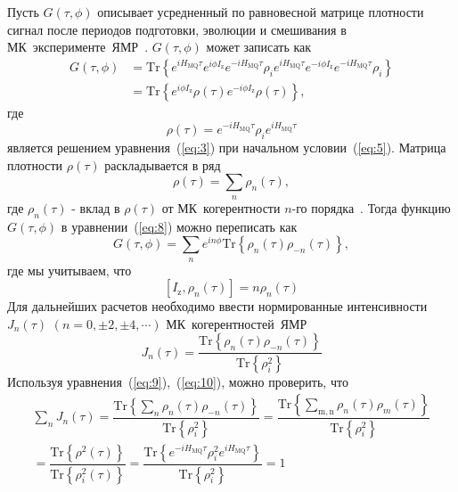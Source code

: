 \documentclass[utf8]{jetp}
\begin{document}
Пусть $G(\tau,\phi)$ описывает усредненный по равновесной матрице плотности сигнал после периодов подготовки, эволюции и смешивания в МК~эксперименте~ЯМР~\cite{Baum_1985}.
$G(\tau,\phi)$ может записать как~\cite{Doronin_2019}
%
\begin{equation}
  \begin{split}
    \label{eq:8}
    G(\tau,\phi)
    & = \mathrm{Tr}\left\{
      e^{i H_\mathrm{MQ} \tau} e^{i\phi I_\mathrm{z}} e^{-i H_\mathrm{MQ}\tau}
      \rho_i
      e^{i H_\mathrm{MQ} \tau} e^{-i \phi I_\mathrm{z}} e^{-i H_\mathrm{MQ} \tau}
      \rho_i
    \right\} \\
    & = \mathrm{Tr} \left\{
    e^{i \phi I_\mathrm{z}}
    \rho(\tau)
    e^{-i \phi I_\mathrm{z}}
    \rho(\tau)
    \right\},
  \end{split}
\end{equation}
%
где
%
\begin{equation}
  \label{eq:9}
  \rho(\tau)
  = e^{-i H_\mathrm{MQ} \tau }
  \rho_i
  e^{i H_\mathrm{MQ} \tau}
\end{equation}
%
является решением уравнения~(\ref{eq:3}) при начальном условии~(\ref{eq:5}).
Матрица плотности $\rho(\tau)$ раскладывается в ряд
%
\begin{equation}
  \label{eq:10}
  \rho(\tau) = \sum\limits_n \rho_n(\tau),
\end{equation}
%
где $\rho_{n}(\tau)$ - вклад в $\rho(\tau)$ от МК~когерентности $n$-го порядка~\cite{Fel_dman_1996}.
Тогда  функцию $G(\tau,\phi)$ в уравнении~(\ref{eq:8}) можно переписать как
%
\begin{equation}
  \label{eq:11}
  G(\tau,\phi)
  = \sum\limits_n e^{i n \phi} \mathrm{Tr} \left\{
    \rho_{n}(\tau) \rho_{-n}(\tau)
  \right\},
\end{equation}
%
где мы учитываем, что
%
\begin{equation}
  \label{eq:12}
  \left[ I_{\mathrm{z}},\rho_n(\tau) \right] = n \rho_n(\tau)
\end{equation}
%
Для дальнейших расчетов необходимо ввести нормированные интенсивности $J_{n}(\tau)$ $(n=0, \pm 2, \pm 4, \cdots)$ МК~когерентностей~ЯМР
%
\begin{equation}
  \label{eq:13}
  J_{n}(\tau) = \dfrac{\mathrm{Tr} \left\{
  \rho_{n}(\tau) \rho_{-n}(\tau)
  \right\}}
  {\mathrm{Tr} \left\{\rho^2_{i} \right\}}
\end{equation}
%
Используя уравнения~(\ref{eq:9}),~(\ref{eq:10}), можно проверить, что
%
\begin{multline}
  \label{eq:14}
  \sum\limits_{n} J_{n}(\tau)
  = \dfrac{
    \mathrm{Tr} \left\{
      \sum_{n} \rho_{n}(\tau) \rho_{-n}(\tau)
    \right\}}
  {\mathrm{Tr} \left\{ \rho^2_{i} \right\}}
  = \dfrac{
    \mathrm{Tr} \left\{
      \sum_{\mathrm{m,n}} \rho_n(\tau)\rho_m(\tau)
  \right\}}
  {\mathrm{Tr} \left\{\rho^2_{i}\right\}}
  \\
  = \dfrac{
    \mathrm{Tr}\left\{\rho^2(\tau)\right\}
  }
  {
    \mathrm{Tr}\left\{\rho^2_{i}(\tau)\right\}
  }
  = \dfrac{
    \mathrm{Tr} \left\{
      e^{-i H_\mathrm{MQ} \tau}
      \rho^{2}_{i}
      e^{i H_\mathrm{MQ} \tau}
    \right\}
  }
  {
    \mathrm{Tr} \left\{ \rho_{i}^{2} \right\}
  }
  = 1
\end{multline}
\end{document}
